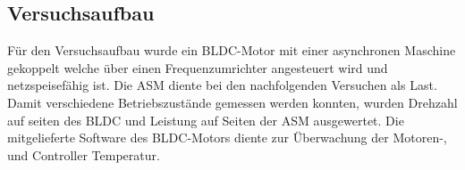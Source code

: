 \subsection{Versuchsaufbau}\label{subsec:Versuchsaufbau}
Für den Versuchsaufbau wurde ein BLDC-Motor mit einer asynchronen Maschine gekoppelt welche über einen Frequenzumrichter angesteuert wird und netzspeisefähig ist. Die ASM diente bei den nachfolgenden Versuchen als Last. Damit verschiedene Betriebszustände gemessen werden konnten, wurden Drehzahl auf seiten des BLDC und Leistung auf Seiten der ASM ausgewertet. Die mitgelieferte Software des BLDC-Motors diente zur Überwachung der Motoren-, und Controller Temperatur.